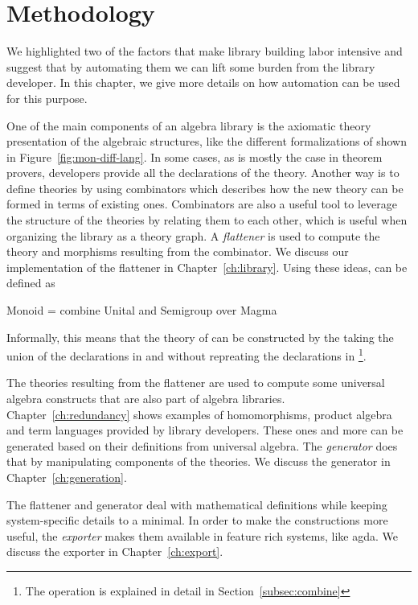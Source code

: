 \chapter{Methodology}
\label{ch:design}

We highlighted two of the factors  that make library building labor intensive and suggest that by automating them we can lift some burden from the library developer. In this chapter, we give more details on how automation can be used for this purpose. 

One of the main components of an algebra library is the axiomatic theory presentation of the algebraic structures, like the different formalizations of  shown in Figure~\ref{fig:mon-diff-lang}. In some cases, as is mostly the case in theorem provers, developers provide all the declarations of the theory. Another way is to define theories by using combinators which describes how the new theory can be formed in terms of existing ones. 
Combinators are also a useful tool to leverage the structure of the theories by relating them to each other, which is useful when organizing the library as a theory graph. A \emph{flattener} is used to compute the theory and morphisms resulting from the combinator. We discuss our implementation of the flattener in Chapter~\ref{ch:library}. Using these ideas,  can be defined as 
\begin{togcode} 
Monoid = combine Unital and Semigroup over Magma
\end{togcode} 
Informally, this means that the theory of  can be constructed by the taking the union of the declarations in   and  without repreating the declarations in \footnote{The  operation is explained in detail in Section~\ref{subsec:combine}}. 

The theories resulting from the flattener are used to compute some universal algebra constructs that are also part of algebra libraries. Chapter~\ref{ch:redundancy} shows examples of homomorphisms, product algebra and term languages provided by library developers. These ones and more can be generated based on their definitions from universal algebra. The \emph{generator} does that by manipulating components of the theories. We discuss the generator in Chapter~\ref{ch:generation}. 

The flattener and generator deal with mathematical definitions while keeping system-specific details to a minimal. In order to make the constructions more useful, the \emph{exporter} makes them available in feature rich systems, like agda. We discuss the exporter in Chapter~\ref{ch:export}. 

